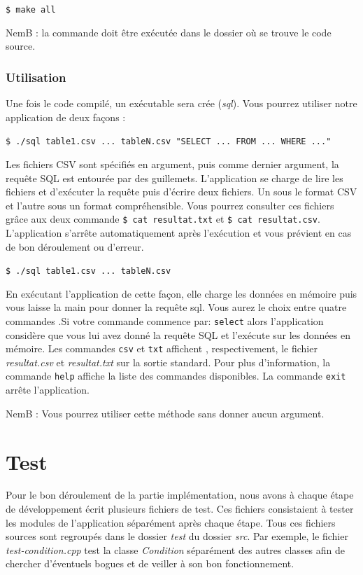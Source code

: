 \documentclass[oneside,13pt,a4paper]{report}
\newcommand\nb[1][0.3]{N\kern-#1emB : }
\begin{document}
\texttt{\$ make all}

\nb la commande doit être exécutée dans le dossier où se trouve le code source.

\subsubsection{Utilisation}

Une fois le code compilé, un exécutable sera crée (\textit{sql}). Vous pourrez utiliser notre application de deux façons :

\texttt{\$ ./sql table1.csv ... tableN.csv "SELECT ... FROM ... WHERE ..."}

Les fichiers CSV sont spécifiés en argument, puis comme dernier argument, la requête SQL est entourée par des guillemets. L'application se charge de lire les fichiers et d'exécuter la requête puis d’écrire deux fichiers. Un sous le format CSV et l'autre sous un format compréhensible. Vous pourrez consulter ces fichiers grâce aux deux commande \texttt{\$ cat resultat.txt} et \texttt{\$ cat resultat.csv}. L'application s'arrête automatiquement après l'exécution et vous prévient en cas de bon déroulement ou d'erreur.

\texttt{\$ ./sql table1.csv ... tableN.csv}

En exécutant l'application de cette façon, elle charge les données en mémoire puis vous laisse la main pour donner la requête sql. Vous aurez le choix entre quatre commandes .Si votre commande commence par: \texttt{select} alors l'application considère que vous lui avez donné la requête SQL et l'exécute sur les données en mémoire. Les commandes \texttt{csv} et \texttt{txt} affichent , respectivement, le fichier \textit{resultat.csv} et \textit{resultat.txt} sur la sortie standard. Pour plus d'information, la commande \texttt{help} affiche la liste des commandes disponibles. La commande \texttt{exit} arrête l'application.

\nb Vous pourrez utiliser cette méthode sans donner aucun argument.

\section{Test}

Pour le bon déroulement de la partie implémentation, nous avons à chaque étape de développement écrit plusieurs fichiers de test. Ces fichiers consistaient à tester les modules de l'application séparément après chaque étape. Tous ces fichiers sources sont regroupés dans le dossier \textit{test} du dossier \textit{src}. Par exemple, le fichier \textit{test-condition.cpp} test la classe \textit{Condition} séparément des autres classes afin de chercher d'éventuels bogues et de veiller à son bon fonctionnement.
\end{document}
